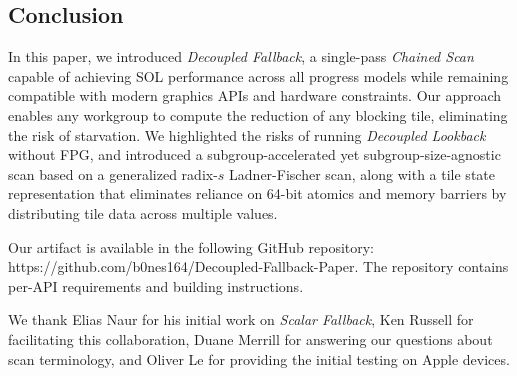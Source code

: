 \documentclass[sigconf,screen]{acmart}
\begin{document}
\subsection{Conclusion}
In this paper, we introduced \emph{Decoupled Fallback}, a single-pass \emph{Chained Scan} capable of achieving SOL performance across all progress models while remaining compatible with modern graphics APIs and hardware constraints. Our approach enables any workgroup to compute the reduction of any blocking tile, eliminating the risk of starvation. We highlighted the risks of running \emph{Decoupled Lookback} without FPG, and introduced a subgroup-accelerated yet subgroup-size-agnostic scan based on a generalized radix-$s$ Ladner-Fischer scan, along with a tile state representation that eliminates reliance on 64-bit atomics and memory barriers by distributing tile data across multiple values.

Our artifact is available in the following GitHub repository: https://github.com/b0nes164/Decoupled-Fallback-Paper. The repository contains per-API requirements and building instructions.

\begin{acks}
We thank Elias Naur for his initial work on \emph{Scalar Fallback}, Ken Russell for facilitating this collaboration, Duane Merrill for answering our questions about scan terminology, and Oliver Le for providing the initial testing on Apple devices.
\end{acks}



\end{document}
